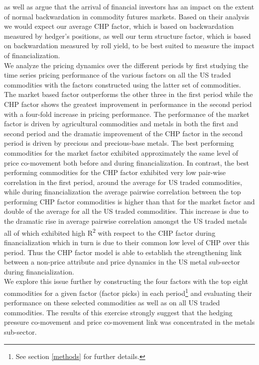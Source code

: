 \documentclass[12pt,]{article}
\let\rmarkdownfootnote\footnote%
\def\footnote{\protect\rmarkdownfootnote}
\begin{document}
\citet{goldstein_commodity_2017} as well as
\citet{goldstein_speculation_2014} argue that the arrival of financial
investors has an impact on the extent of normal backwardation in
commodity futures markets. Based on their analysis we would expect our
average CHP factor, which is based on backwardation measured by hedger's
positions, as well our term structure factor, which is based on
backwardation measured by roll yield, to be best suited to measure the
impact of financialization.\\
We analyze the pricing dynamics over the different periods by first
studying the time series pricing performance of the various factors on
all the US traded commodities with the factors constructed using the
latter set of commodities. The market based factor outperforms the other
three in the first period while the CHP factor shows the greatest
improvement in performance in the second period with a four-fold
increase in pricing performance. The performance of the market factor is
driven by agricultural commodities and metals in both the first and
second period and the dramatic improvement of the CHP factor in the
second period is driven by precious and precious-base metals. The best
performing commodities for the market factor exhibited approximately the
same level of price co-movement both before and during financialization.
In contrast, the best performing commodities for the CHP factor
exhibited very low pair-wise correlation in the first period, around the
average for US traded commodities, while during financialization the
average pairwise correlation between the top performing CHP factor
commodities is higher than that for the market factor and double of the
average for all the US traded commodities. This increase is due to the
dramatic rise in average pairwise correlation amongst the US traded
metals all of which exhibited high R\textsuperscript{2} with respect to
the CHP factor during financialization which in turn is due to their
common low level of CHP over this period. Thus the CHP factor model is
able to establish the strengthening link between a non-price attribute
and price dynamics in the US metal sub-sector during financialization.\\
We explore this issue further by constructing the four factors with the
top eight commodities for a given factor (factor picks) in each
period\footnote{See section \ref{methods} for further details.} and
evaluating their performance on these selected commodities as well as on
all US traded commodities. The results of this exercise strongly suggest
that the hedging pressure co-movement and price co-movement link was
concentrated in the metals sub-sector.
\end{document}
